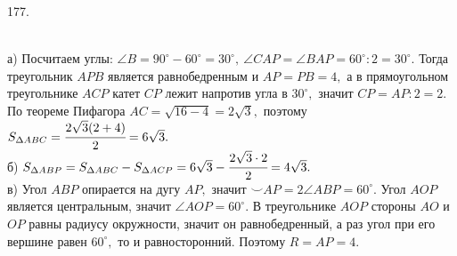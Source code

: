 177. \begin{figure}[ht!]
\end{figure}\\
а) Посчитаем углы: $\angle B=90^\circ-60^\circ=30^\circ,\ \angle CAP=\angle BAP=60^\circ:2=30^\circ.$ Тогда треугольник $APB$ является равнобедренным и $AP=PB=4,$ а в прямоугольном треугольнике $ACP$ катет $CP$ лежит напротив угла в $30^\circ,$ значит $CP=AP:2=2.$ По теореме Пифагора $AC=\sqrt{16-4}=2\sqrt{3},$ поэтому $S_{\Delta ABC}=\cfrac{2\sqrt{3}(2+4)}{2}=6\sqrt{3}.$\\
б) $S_{\Delta ABP}=S_{\Delta ABC}-S_{\Delta ACP}=6\sqrt{3}-\cfrac{2\sqrt{3}\cdot2}{2}=4\sqrt{3}.$\\
в) Угол $ABP$ опирается на дугу $AP,$ значит $\smile AP=2\angle ABP=60^\circ.$ Угол $AOP$ является центральным, значит $\angle AOP=60^\circ.$ В треугольнике $AOP$ стороны $AO$ и $OP$ равны радиусу окружности, значит он равнобедренный, а раз угол при его вершине равен $60^\circ,$ то и равносторонний. Поэтому $R=AP=4.$\\

